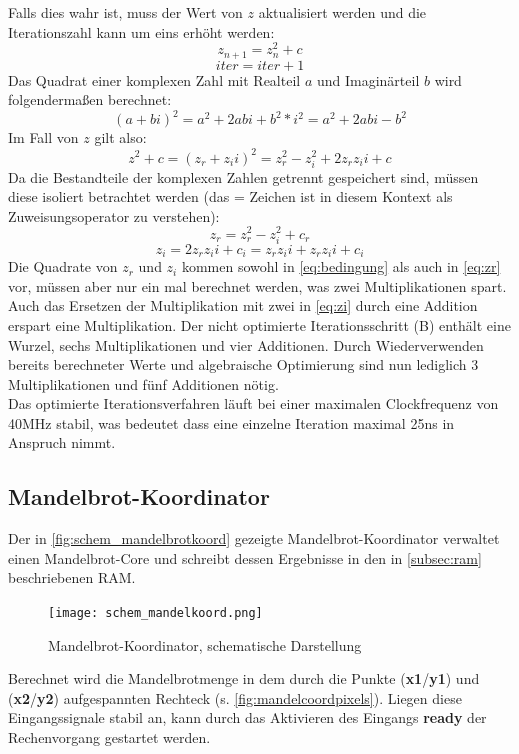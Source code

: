 \documentclass[a4paper,12pt,onesided]{report}
\begin{document}
Falls dies wahr ist, muss der Wert von $z$ aktualisiert werden und die Iterationszahl kann um eins erhöht werden:
\[z_{n+1} = z_n^2 + c\]
\[iter = iter + 1\]
Das Quadrat einer komplexen Zahl mit Realteil $a$ und Imaginärteil $b$ wird folgendermaßen berechnet:
\[(a + bi)^2 = a^2 + 2abi + b^2*i^2 = a^2 + 2abi - b^2\]
Im Fall von $z$ gilt also:
\[z^2+c=(z_r + z_ii)^2 = z_r^2 - z_i^2 + 2z_rz_ii + c\]
Da die Bestandteile der komplexen Zahlen getrennt gespeichert sind, müssen diese isoliert betrachtet werden (das = Zeichen ist in diesem Kontext als Zuweisungsoperator zu verstehen):
\begin{equation}
	\label{eq:zr}
	z_r = z_r^2 - z_i^2 + c_r
\end{equation}
\begin{equation}
	\label{eq:zi}
	z_i = 2z_rz_ii + c_i = z_rz_ii + z_rz_ii + c_i
\end{equation}
Die Quadrate von $z_r$ und $z_i$ kommen sowohl in \autoref{eq:bedingung} als auch in \autoref{eq:zr} vor, müssen aber nur ein mal berechnet werden, was zwei Multiplikationen spart.\\
Auch das Ersetzen der Multiplikation mit zwei in \autoref{eq:zi} durch eine Addition erspart eine Multiplikation.
Der nicht optimierte Iterationsschritt (B) enthält eine Wurzel, sechs Multiplikationen und vier Additionen.
Durch Wiederverwenden bereits berechneter Werte und algebraische Optimierung sind nun lediglich 3 Multiplikationen und fünf Additionen nötig.\\
Das optimierte Iterationsverfahren läuft bei einer maximalen Clockfrequenz von 40MHz stabil, was bedeutet dass eine einzelne Iteration maximal 25ns in Anspruch nimmt.

\subsection{Mandelbrot-Koordinator}
Der in \autoref{fig:schem_mandelbrotkoord} gezeigte Mandelbrot-Koordinator verwaltet einen Mandelbrot-Core und schreibt dessen Ergebnisse in den in \autoref{subsec:ram} beschriebenen RAM.

\begin{figure}[H]
	\centering
	\texttt{[image: schem\_mandelkoord.png]}
	\caption{Mandelbrot-Koordinator, schematische Darstellung}
	\label{fig:schem_mandelbrotkoord}
\end{figure}
Berechnet wird die Mandelbrotmenge in dem durch die Punkte (\textbf{x1}/\textbf{y1}) und (\textbf{x2}/\textbf{y2}) aufgespannten Rechteck (s. \autoref{fig:mandelcoordpixels}).
Liegen diese Eingangssignale stabil an, kann durch das Aktivieren des Eingangs \textbf{ready} der Rechenvorgang gestartet werden.
\end{document}
